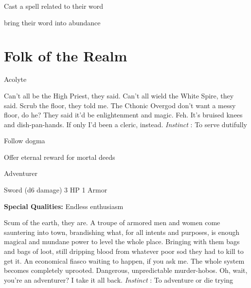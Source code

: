 \startitemize[1,packed]
         
\item Cast a spell related to their word

         
\item bring their word into abundance

       
\stopitemize
                
\section{Folk of the Realm}    
            
\startMonsterName
Acolyte	
\stopMonsterName
       
\startMonsterDescription
Can’t all be the High Priest, they said. Can’t all wield the White Spire, they said. Scrub the floor, they told me. The Cthonic Overgod don’t want a messy floor, do he? They said it’d be enlightenment and magic. Feh. It’s bruised knees and dish-pan-hands. If only I’d been a cleric, instead. {\em Instinct} : To serve dutifully
\stopMonsterDescription
       
\startitemize[1,packed]
         
\item Follow dogma

         
\item Offer eternal reward for mortal deeds

       
\stopitemize
       
\startMonsterName
Adventurer	 
\stopMonsterName
       

Sword (d6 damage)	3 HP	1 Armor

       


       
\startMonsterQualities
         {\bf Special Qualities:}  Endless enthusiasm
\stopMonsterQualities
       
\startMonsterDescription
Scum of the earth, they are. A troupe of armored men and women come sauntering into town, brandishing what, for all intents and purposes, is enough magical and mundane power to level the whole place. Bringing with them bags and bags of loot, still dripping blood from whatever poor sod they had to kill to get it. An economical fiasco waiting to happen, if you ask me. The whole system becomes completely uprooted. Dangerous, unpredictable murder-hobos. Oh, wait, you’re an adventurer? I take it all back. {\em Instinct} : To adventure or die trying
\stopMonsterDescription
       
